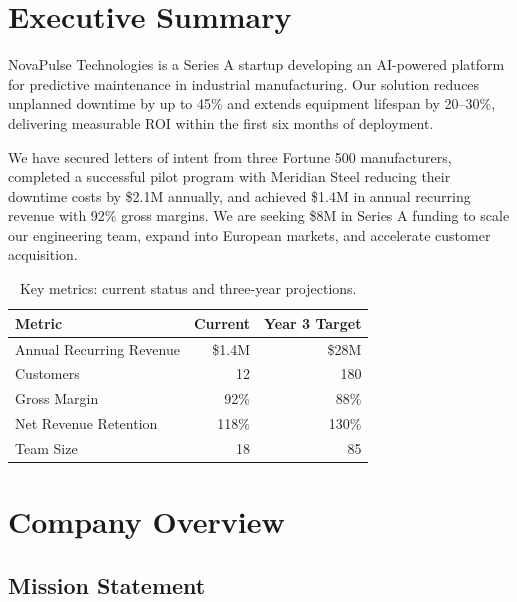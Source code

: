 \documentclass[
    language=english,
    doctype=business-plan,
    institution=none,
]{../../omnilatex}
\begin{document}
\maketitle

\section*{Executive Summary}

NovaPulse Technologies is a Series A startup developing an AI-powered platform
for predictive maintenance in industrial manufacturing. Our solution reduces
unplanned downtime by up to 45\% and extends equipment lifespan by 20--30\%,
delivering measurable ROI within the first six months of deployment.

We have secured letters of intent from three Fortune 500 manufacturers,
completed a successful pilot program with Meridian Steel reducing their
downtime costs by \$2.1M annually, and achieved \$1.4M in annual recurring
revenue with 92\% gross margins. We are seeking \$8M in Series A funding to
scale our engineering team, expand into European markets, and accelerate
customer acquisition.

\begin{table}[h]
    \centering
    \begin{tabular}{lrr}
        \toprule
        \textbf{Metric} & \textbf{Current} & \textbf{Year 3 Target} \\
        \midrule
        Annual Recurring Revenue  & \$1.4M   & \$28M   \\
        Customers                 & 12       & 180     \\
        Gross Margin              & 92\%     & 88\%    \\
        Net Revenue Retention     & 118\%    & 130\%   \\
        Team Size                 & 18       & 85      \\
        \bottomrule
    \end{tabular}
    \caption{Key metrics: current status and three-year projections.}
\end{table}

\section{Company Overview}

\subsection{Mission Statement}
\end{document}
